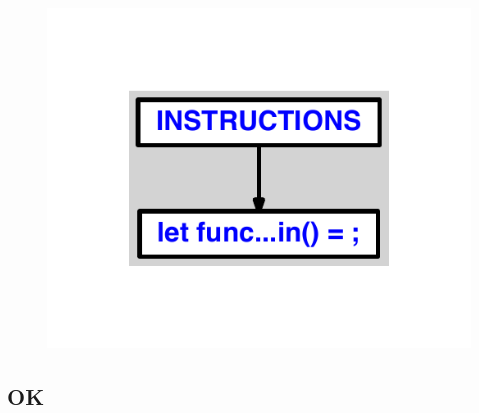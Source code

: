 \documentclass{article}
\begin{document}
\begin{figure}[H]\centering\includegraphics[max width=\textwidth]{ast/ast_38.pdf}\end{figure}\subsection{OK}
\end{document}
